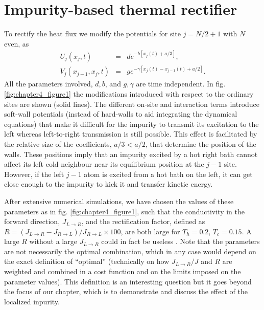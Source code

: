 \section{Impurity-based thermal rectifier \label{sec:Impurity_rectifier}}

To rectify the heat flux
we modify the potentials for site $j=N/2+1$ with $N$ even, as
%
%
\begin{eqnarray}
\label{IMP}
U_j(x_j,t)&=&d e^{-b [x_j(t)+a/3]},
\\
V_j(x_{j-1},x_j,t)&=&ge^{-\gamma [x_j(t)-x_{j-1}(t)+a/2]}.
\end{eqnarray}
%
All the parameters involved, $d, b$, and $g,\gamma$ are time independent. In fig. \ref{fig:chapter4_figure1} the modifications introduced with respect to the ordinary sites are shown (solid lines).  The different on-site and interaction terms introduce soft-wall potentials
(instead of hard-walls to aid integrating the dynamical equations) that make it difficult for the impurity to transmit its excitation to the left whereas left-to-right transmission is still possible.
This effect is facilitated by the relative size of the coefficients, $a/3<a/2$, that determine the position of the walls.
These positions imply that an impurity excited by a hot right bath cannot affect its left cold neighbour near its equilibrium position at the $j-1$ site.
However, if the left $j-1$ atom is excited from a hot bath on the left,
it can get close enough to the impurity to kick it and transfer kinetic energy.

After extensive numerical simulations, we have chosen the values of these parameters as in fig. \ref{fig:chapter4_figure1}, such that the conductivity in the forward direction, $J_{L\rightarrow R}$, and the rectification factor, defined as $R=(J_{L\rightarrow R}-J_{R\rightarrow L}) / J_{R\rightarrow L}\times 100$,
are both large for $T_h=0.2$, $T_c=0.15$. A large $R$ without a large $J_{L\rightarrow R}$ could in fact be useless \cite{Roberts2011}.
Note that the parameters are not necessarily the optimal combination, which in any case would depend on the exact definition of ``optimal'' (technically on how $J_{L\rightarrow R}/J$ and $R$ are weighted and combined in a cost function and on the limits imposed on the
parameter values). This definition is an interesting question but it goes beyond the focus of our chapter,
which is to demonstrate and discuss the effect of the localized inpurity.


